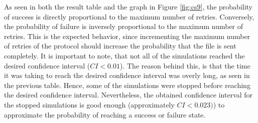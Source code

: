 As seen in both the result table and the graph in Figure \ref{fig:cs9}, the probability of success is directly proportional to the maximum number of retries. Conversely, the probability of failure is inversely proportional to the maximum number of retries. This is the expected behavior, since incrementing the maximum number of retries of the protocol should increase the probability that the file is sent completely. It is important to note, that not all of the simulations reached the desired confidence interval ($CI < 0.01$). The reason behind this, is that the time it  was taking to reach the desired confidence interval was overly long, as seen in the previous table. Hence, some of the simulations were stopped before reaching the desired confidence interval. Nevertheless, the obtained confidence interval for the stopped simulations is good enough (approximately $CI < 0.023)$) to approximate the probability of reaching a success or failure state.

